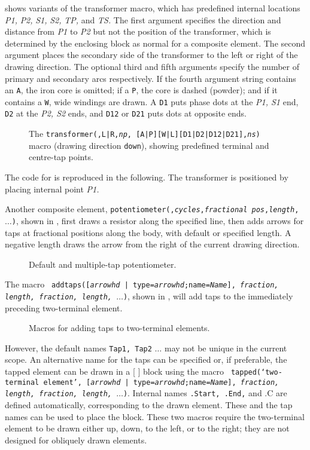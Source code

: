  shows variants of the transformer macro,
which has predefined internal locations
{\sl P1,} {\sl P2,} {\sl S1,} {\sl S2,} {\sl TP,} and {\sl TS.}
The first argument specifies the direction and distance from {\sl P1}
to {\sl P2} but not the position of the transformer, which is determined
by the enclosing block as normal for a composite element.  The second
argument places the secondary side of the transformer to the left or
right of the drawing direction.  The optional third and fifth arguments
specify the number of primary and secondary arcs respectively.  If the
fourth argument string contains an {\tt A}, the iron core is omitted;
if a {\tt P}, the core is dashed (powder); and if it contains a {\tt W},
wide windings are drawn.  A {\tt D1} puts phase dots at the {\sl P1,
S1} end, {\tt D2} at the {\sl P2, S2} ends, and {\tt D12} or {\tt D21}
puts dots at opposite ends.
\begin{figure}[H]
   
  \caption{The {\tt transformer(\linespec,L|R,{\sl np},%
[A|P][W|L][D1|D2|D12|D21],{\sl ns})}
     macro (drawing direction {\tt down}), showing predefined terminal
     and centre-tap points.}
   \label{Xform}
   \end{figure}

The code for  is reproduced in the following.
The transformer is positioned by placing internal point {\sl P1.}


Another composite element,
 {\tt potentiometer(\linespec,{\sl cycles},{\sl fractional pos},{\sl length},
    $\ldots$)},
shown in ,
first draws a resistor along the specified line, then adds arrows for taps
at fractional positions along the body, with default or specified length.
A negative length draws the arrow from the right of the current drawing
direction.
\begin{figure}[H]
   
   \caption{Default and multiple-tap potentiometer.}
   \label{Potentiometers}
   \end{figure}

\pagebreak
The macro {\tt
    addtaps([{\sl arrowhd} | type={\sl arrowhd};name={\sl Name}],
    {\sl fraction, length, fraction, length,}
    $\ldots$)},
shown in , will add taps to the
immediately preceding two-terminal element.
\begin{figure}[H]
   
   \caption{Macros for adding taps to two-terminal elements.}
   \label{Taps}
   \end{figure}
However, the default names
{\tt Tap1, Tap2} $\ldots$ may not be unique in the current scope.  An
alternative name for the taps can be specified or, if preferable, the
tapped element can be drawn in a [ ] block using the macro {\tt
  tapped(`{\sl two-terminal element}',
  [{\sl arrowhd} | type={\sl arrowhd};name={\sl Name}],
    {\sl fraction, length, fraction, length,} $\ldots$)}.
   Internal names {\tt .Start, .End,} and {.C} are defined automatically,
   corresponding to the drawn element. These and the tap names can be used
   to place the block.
These two macros require the two-terminal element to be drawn either up,
down, to the left, or to the right; they are not designed for obliquely
drawn elements.

